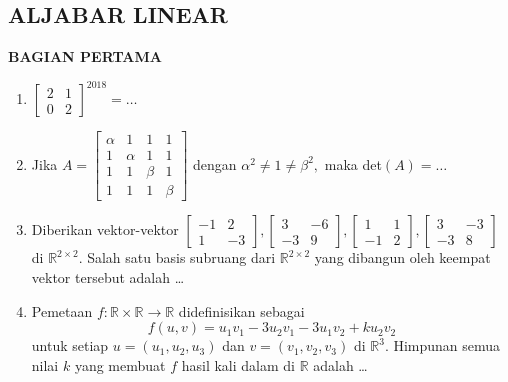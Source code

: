 \documentclass[12pt,twoside]{article}
\begin{document}
\pagebreak
\subsection{ALJABAR LINEAR}
\textbf{BAGIAN PERTAMA}
\begin{enumerate}
	\item $\left[ \begin{array}{cc}
				      2 & 1 \\0&2
			      \end{array} \right]^{2018} = \dots$

	\item Jika $A = \left[ \begin{array}{cccc}
				      \alpha & 1      & 1     & 1     \\
				      1      & \alpha & 1     & 1     \\
				      1      & 1      & \beta & 1     \\
				      1      & 1      & 1     & \beta
			      \end{array} \right]$ dengan $\alpha^2 \neq 1 \neq \beta^2, $ maka det$(A) =\dots$

	\item Diberikan vektor-vektor $\left[ \begin{array}{cc}
				      -1 & 2 \\1&-3
			      \end{array} \right], \left[ \begin{array}{cc}
				      3 & -6 \\-3&9
			      \end{array} \right], \left[ \begin{array}{cc}
				      1 & 1 \\-1&2
			      \end{array} \right], \left[ \begin{array}{cc}
				      3 & -3 \\-3&8
			      \end{array} \right]$ di $\mathbb{R}^{2 \times 2}$. Salah satu basis subruang dari $\mathbb{R}^{2 \times 2}$ yang dibangun oleh keempat vektor tersebut adalah \dots

	\item Pemetaan $f : \mathbb{R} \times \mathbb{R} \to \mathbb{R}$ didefinisikan sebagai
	      \begin{equation*}
		      f(u,v) = u_1v_1 - 3u_2v_1 - 3u_1v_2 + ku_2v_2
	      \end{equation*}
	      untuk setiap $u = (u_1,u_2,u_3)$ dan $v =  (v_1,v_2,v_3)$ di $\mathbb{R}^3$. Himpunan semua nilai $k$ yang membuat $f$ hasil kali dalam di $\mathbb{R}$ adalah \dots


\end{enumerate}
\end{document}
